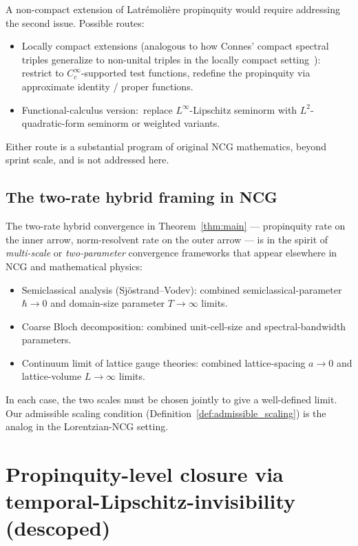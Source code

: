 \documentclass[11pt,a4paper]{article}
\theoremstyle{plain}
\theoremstyle{definition}
\begin{document}
A non-compact extension of Latr\'emoli\`ere propinquity would require
addressing the second issue. Possible routes:
\begin{itemize}
\item Locally compact extensions (analogous to how Connes' compact
spectral triples generalize to non-unital triples in the locally
compact setting~\cite{gayral_gracia_bondia_iochum_schucker_varilly2004}):
restrict to $C_{c}^{\infty}$-supported test functions, redefine the
propinquity via approximate identity / proper functions.
\item Functional-calculus version:\ replace $L^{\infty}$-Lipschitz
seminorm with $L^{2}$-quadratic-form seminorm or weighted variants.
\end{itemize}
Either route is a substantial program of original NCG mathematics,
beyond sprint scale, and is not addressed here.

\subsection{The two-rate hybrid framing in
NCG}\label{sec:hybrid_framing}

The two-rate hybrid convergence in Theorem~\ref{thm:main} —
propinquity rate on the inner arrow, norm-resolvent rate on the outer
arrow — is in the spirit of \emph{multi-scale} or
\emph{two-parameter} convergence frameworks that appear elsewhere in
NCG and mathematical physics:
\begin{itemize}
\item Semiclassical analysis (Sj\"ostrand--Vodev): combined
semiclassical-parameter $\hbar \to 0$ and domain-size parameter
$T \to \infty$ limits.
\item Coarse Bloch decomposition: combined unit-cell-size and
spectral-bandwidth parameters.
\item Continuum limit of lattice gauge theories: combined
lattice-spacing $a \to 0$ and lattice-volume $L \to \infty$ limits.
\end{itemize}
In each case, the two scales must be chosen jointly to give a
well-defined limit. Our admissible scaling condition
(Definition~\ref{def:admissible_scaling}) is the analog in the
Lorentzian-NCG setting.

\section{Propinquity-level closure via temporal-Lipschitz-invisibility (descoped)}\label{sec:g2_metric}
\end{document}
